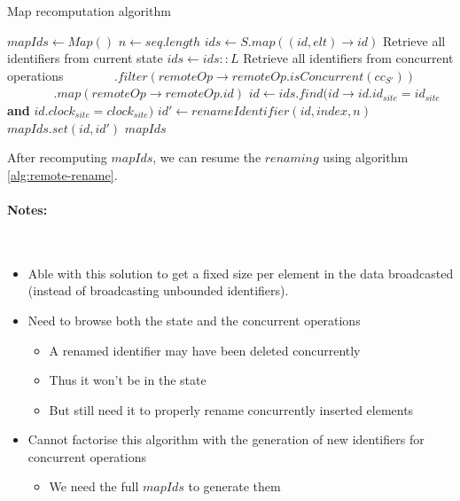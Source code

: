 \documentclass[a4paper]{article}
\begin{document}
\begin{algorithm}
  \caption{Map recomputation algorithm}
  \label{alg:recompute-map}
  \begin{algorithmic}
      \State $mapIds \gets Map()$
      \State $n \gets seq.length$
      \State $ids \gets S.map((id, elt) \to id)$
      \Comment Retrieve all identifiers from current state
      \State $ids \gets ids :: L$
      \Comment Retrieve all identifiers from concurrent operations
      \State $~~~~~~~~~~~~~~~~~.filter(remoteOp \to remoteOp.isConcurrent(cc_{S'}))$
      \State $~~~~~~~~~~~~~~~~~.map(remoteOp \to remoteOp.id)$
        \State $id \gets ids.find(id \to id.id_{site} = id_{site}$ \textbf{and} $id.clock_{site} = clock_{site})$
        \State $id' \gets renameIdentifier(id, index, n)$
        \State $mapIds.set(id, id')$
      \EndFor
      \State \Return $mapIds$
    \EndFunction
  \end{algorithmic}
\end{algorithm}

After recomputing $mapIds$, we can resume the $renaming$ using algorithm \ref{alg:remote-rename}.

\paragraph{Notes:}~\\

\begin{itemize}
  \item Able with this solution to get a fixed size per element in the data broadcasted
    (instead of broadcasting unbounded identifiers).
  \item Need to browse both the state and the concurrent operations
  \begin{itemize}
    \item A renamed identifier may have been deleted concurrently
    \item Thus it won't be in the state
    \item But still need it to properly rename concurrently inserted elements
  \end{itemize}
  \item Cannot factorise this algorithm with the generation of new identifiers
    for concurrent operations
  \begin{itemize}
    \item We need the full $mapIds$ to generate them
  \end{itemize}
\end{itemize}
\end{document}

